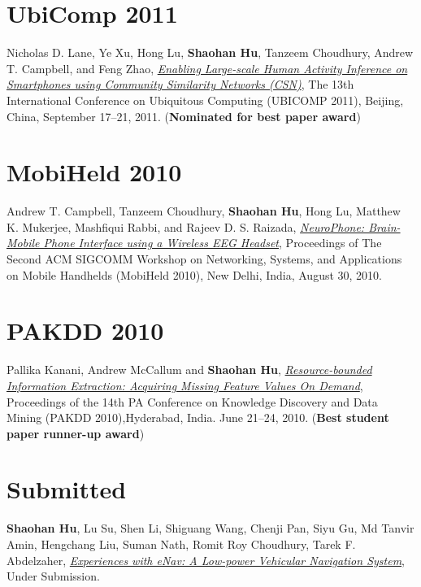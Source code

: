 \section{\sc UbiComp 2011}\hypertarget{lane2011ubicomp}{} Nicholas D. Lane, Ye Xu, Hong Lu, \textbf{Shaohan Hu}, Tanzeem Choudhury, Andrew T. Campbell, and Feng Zhao, \href{http://portal.acm.org/citation.cfm?id=2030160}{\emph{Enabling Large-scale Human Activity Inference on Smartphones using Community Similarity Networks (CSN)}}, \textsf{The 13th International Conference on Ubiquitous Computing (UBICOMP 2011)}, Beijing, China, September 17--21, 2011. (\textbf{Nominated for best paper award})

\section{\sc MobiHeld 2010}\hypertarget{campbell2010mobiheld}{} Andrew T. Campbell, Tanzeem Choudhury, \textbf{Shaohan Hu}, Hong Lu, Matthew K. Mukerjee, Mashfiqui Rabbi, and Rajeev D. S. Raizada, \href{http://portal.acm.org/citation.cfm?id=1851326}{\emph{NeuroPhone: Brain-Mobile Phone Interface using a Wireless EEG Headset}}, \textsf{Proceedings of The Second ACM SIGCOMM Workshop on Networking, Systems, and Applications on Mobile Handhelds (MobiHeld 2010)}, New Delhi, India, August 30, 2010.

\section{\sc PAKDD 2010}\hypertarget{kanani2010pakdd}{} Pallika Kanani, Andrew McCallum and \textbf{Shaohan Hu}, \href{http://www.springerlink.com/content/j41w758434321108}{\emph{Resource-bounded Information Extraction: Acquiring Missing Feature Values On Demand}}, \textsf{Proceedings of the 14th PA Conference on Knowledge Discovery and Data Mining (PAKDD 2010)},Hyderabad, India. June 21--24, 2010. (\textbf{Best student paper runner-up award})


\section{\sc Submitted}\hypertarget{}{} \textbf{Shaohan Hu}, Lu Su, Shen Li, Shiguang Wang, Chenji Pan, Siyu Gu, Md Tanvir Amin, Hengchang Liu, Suman Nath, Romit Roy Choudhury, Tarek F. Abdelzaher, \href{}{\emph{Experiences with eNav: A Low-power Vehicular Navigation System}}, \textsf{Under Submission}.

